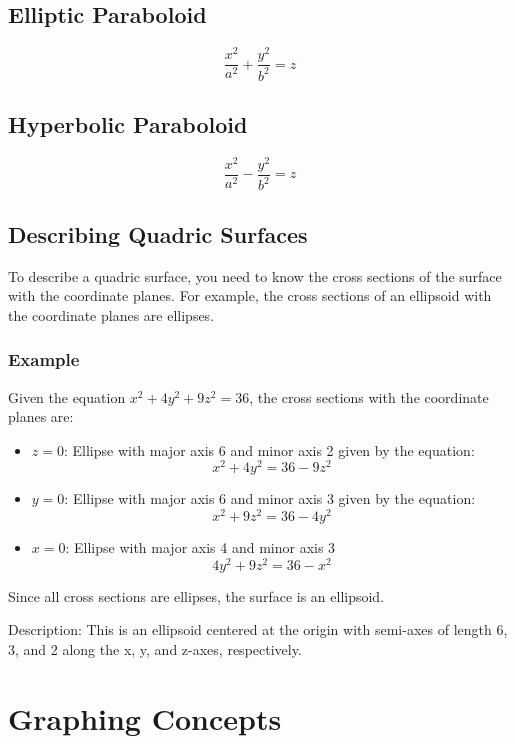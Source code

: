\subsection{Elliptic Paraboloid}
\begin{equation}\label{Equation of an Elliptic Paraboloid}
    \dfrac{x^2}{a^2} + \dfrac{y^2}{b^2} = z
\end{equation}

\subsection{Hyperbolic Paraboloid}
\begin{equation}\label{Equation of a Hyperbolic Paraboloid}
    \dfrac{x^2}{a^2} - \dfrac{y^2}{b^2} = z
\end{equation}

\subsection{Describing Quadric Surfaces}
To describe a quadric surface, you need to know the cross sections of the surface with the coordinate planes. For example, the cross sections of an ellipsoid with the coordinate planes are ellipses.
\subsubsection{Example}
Given the equation \(x^2 + 4y^2 + 9z^2 = 36\), the cross sections with the coordinate planes are:
\begin{itemize}
    \item{\(z = 0\): Ellipse with major axis 6 and minor axis 2 given by the equation:}
    \[
        x^2 + 4y^2 = 36-9z^2
    \]
    \item{\(y = 0\): Ellipse with major axis 6 and minor axis 3 given by the equation:}
    \[
        x^2 + 9z^2 = 36-4y^2
    \]
    \item{\(x = 0\): Ellipse with major axis 4 and minor axis 3}
    \[
        4y^2 + 9z^2 = 36-x^2
    \]
\end{itemize}
Since all cross sections are ellipses, the surface is an ellipsoid.

Description: This is an ellipsoid centered at the origin with semi-axes of length 6, 3, and 2 along the x, y, and z-axes, respectively.

\section{Graphing Concepts}

